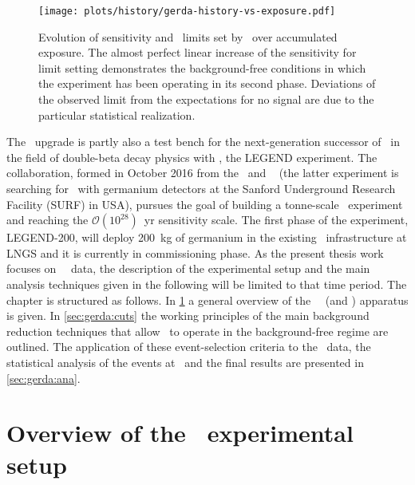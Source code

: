 \begin{figure}
  \centering
  \texttt{[image: plots/history/gerda-history-vs-exposure.pdf]}
  \caption{%
    Evolution of sensitivity and \thalfzero\ limits set by \gerda\ over accumulated
    exposure. The almost perfect linear increase of the sensitivity for limit setting
    demonstrates the background-free conditions in which the experiment has been operating
    in its second phase. Deviations of the observed limit from the expectations for no
    signal are due to the particular statistical realization.
  }\label{img:exp:gerda-history}
\end{figure}
\newpar
The \phasetwop\ upgrade is partly also a test bench for the next-generation successor of
\gerda\ in the field of double-beta decay physics with \gesix, the LEGEND experiment. The
collaboration, formed in October 2016 from the \gerda\ and \majorana~\cite{Abgrall2014}
(the latter experiment is searching for \onbb\ with germanium detectors at the Sanford
Underground Research Facility (SURF) in USA), pursues the goal of building a tonne-scale
\gesix\ experiment and reaching the $\mathcal{O}(10^{28})$~yr sensitivity scale. The first
phase of the experiment, LEGEND-200, will deploy 200~kg of germanium in the existing \gerda\
infrastructure at LNGS and it is currently in commissioning phase.
\newpar
As the present thesis work focuses on \gerda\ \phasetwo\ data, the description of the
experimental setup and the main analysis techniques given in the following will be limited
to that time period. The chapter is structured as follows. In \cref{sec:gerda:setup} a
general overview of the \gerda\ \phasetwo\ (and \phasetwop) apparatus is given. In
\cref{sec:gerda:cuts} the working principles of the main background reduction techniques
that allow \gerda\ to operate in the background-free regime are outlined. The application
of these event-selection criteria to the \phasetwo\ data, the statistical analysis of the
events at \qbb\ and the final results are presented in \cref{sec:gerda:ana}.

\section{Overview of the \phasetwo\ experimental setup}%
\label{sec:gerda:setup}

